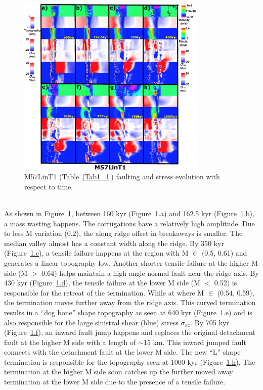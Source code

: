 \begin{figure}[h]
 \centering
  \includegraphics[width=0.8\textwidth]{./Figures/fig_Results_MRange_2_M57LinT1_time_evolution.eps}
 \caption{M57LinT1 (Table~\hyperref[Tab1_1]{\ref{Tab1_1}}) faulting and stress evolution with respect to time.}
\label{fig_Results_MRange_2}
\end{figure}
~\\
As shown in Figure~\hyperref[fig_Results_MRange_2]{\ref{fig_Results_MRange_2}}, between 160 kyr (Figure~\hyperref[fig_Results_MRange_2]{\ref{fig_Results_MRange_2}.a}) and 162.5 kyr (Figure~\hyperref[fig_Results_MRange_2]{\ref{fig_Results_MRange_2}.b}), a mass wasting happens. The corrugations have a relatively high amplitude. Due to less M variation (0.2), the along ridge offset in breakaways is smaller. The median valley almost has a constant width along the ridge. By 350 kyr (Figure~\hyperref[fig_Results_MRange_2]{\ref{fig_Results_MRange_2}.c}), a tensile failure happens at the region with M $\in$ (0.5, 0.61) and generates a linear topography low. Another shorter tensile failure at the higher M side (M $>$ 0.64) helps maintain a high angle normal fault near the ridge axis. By 430 kyr (Figure~\hyperref[fig_Results_MRange_2]{\ref{fig_Results_MRange_2}.d}), the tensile failure at the lower M side (M $<$ 0.52) is responsible for the retreat of the termination. While at where M $\in$ (0.54, 0.59), the termination moves further away from the ridge axis. This curved termination results in a ``dog bone'' shape topography as seen at 640 kyr (Figure~\hyperref[fig_Results_MRange_2]{\ref{fig_Results_MRange_2}.e}) and is also responsible for the large sinistral shear (blue) stress $\sigma_{xz}$. By 705 kyr (Figure~\hyperref[fig_Results_MRange_2]{\ref{fig_Results_MRange_2}.f}), an inward fault jump happens and replaces the original detachment fault at the higher M side with a length of $\sim$15 km. This inward jumped fault connects with the detachment fault at the lower M side. The new ``L'' shape termination is responsible for the topography seen at 1000 kyr (Figure~\hyperref[fig_Results_MRange_2]{\ref{fig_Results_MRange_2}.h}). The termination at the higher M side soon catches up the further moved away termination at the lower M side due to the presence of a tensile failure.
       
